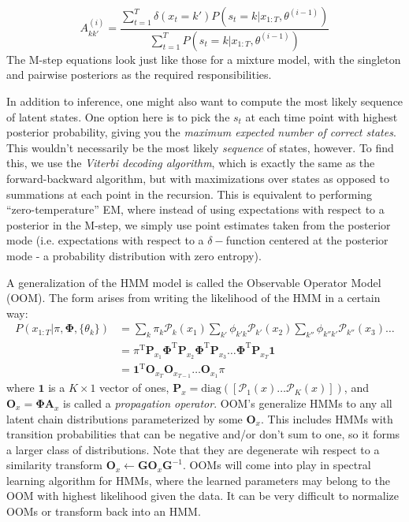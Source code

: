 \documentclass[a4paper]{article}
\begin{document}
\[ A_{kk'}^{(i)} = \frac{\sum_{t=1}^T \delta(x_t = k')P(s_t = k|x_{1:T},\theta^{(i-1)})}{\sum_{t=1}^T P(s_t = k|x_{1:T},\theta^{(i-1)})} \]
The M-step equations look just like those for a mixture model, with the singleton and pairwise posteriors as the required responsibilities. 

In addition to inference, one might also want to compute the most likely sequence of latent states. One option here is to pick the $s_t$ at each time point with highest posterior probability, giving you the \emph{maximum expected number of correct states}. This wouldn't necessarily be the most likely \emph{sequence} of states, however. To find this, we use the \emph{Viterbi decoding algorithm}, which is exactly the same as the forward-backward algorithm, but with maximizations over states as opposed to summations at each point in the recursion. This is equivalent to performing ``zero-temperature'' EM, where instead of using expectations with respect to a posterior in the M-step, we simply use point estimates taken from the posterior mode (i.e. expectations with respect to a $\delta-$function centered at the posterior mode - a probability distribution with zero entropy).

A generalization of the HMM model is called the Observable Operator Model (OOM). The form arises from writing the likelihood of the HMM in a certain way:
\begin{align*}
P(x_{1:T}|\pi,\mathbf{\Phi},\{\theta_k\}) &= \sum_k \pi_k\mathcal{P}_k(x_1) \sum_{k'}\phi_{k'k}\mathcal{P}_{k'}(x_2) \sum_{k''}\phi_{k''k'}\mathcal{P}_{k''}(x_3)\ldots \\
&= \pi^\textrm{T}\mathbf{P}_{x_1}\mathbf{\Phi}^\textrm{T}\mathbf{P}_{x_2}\mathbf{\Phi}^\textrm{T}\mathbf{P}_{x_3}\ldots \mathbf{\Phi}^\textrm{T}\mathbf{P}_{x_T} \mathbf{1} \\
&= \mathbf{1}^\textrm{T} \mathbf{O}_{x_T}\mathbf{O}_{x_{T-1}}\ldots\mathbf{O}_{x_1}\pi
\end{align*}
where $\mathbf{1}$ is a $K\times 1$ vector of ones, $\mathbf{P}_x = \textrm{diag}([\mathcal{P}_1(x) \ldots \mathcal{P}_K(x)])$, and $\mathbf{O}_{x} = \mathbf{\Phi A}_x$ is called a \emph{propagation operator}. OOM's generalize HMMs to any all latent chain distributions parameterized by some $\mathbf{O}_{x}$. This includes HMMs with transition probabilities that can be negative and/or don't sum to one, so it forms a larger class of distributions. Note that they are degenerate wih respect to a similarity transform $\mathbf{O}_{x} \leftarrow \mathbf{GO}_{x}\mathbf{G}^{-1}$. OOMs will come into play in spectral learning algorithm for HMMs, where the learned parameters may belong to the OOM with highest likelihood given the data. It can be very difficult to normalize OOMs or transform back into an HMM.
\end{document}
